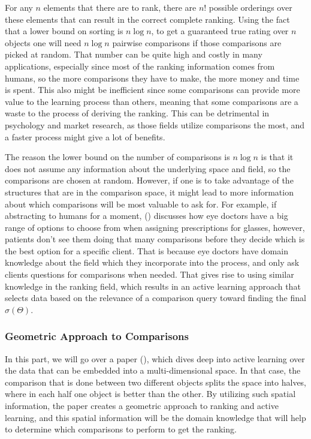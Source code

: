 \documentclass[
  letterpaper,
  DIV=11,
  numbers=noendperiod,
  oneside]{scrreprt}
\theoremstyle{remark}
\begin{document}
For any \(n\) elements that there are to rank, there are \(n!\) possible
orderings over these elements that can result in the correct complete
ranking. Using the fact that a lower bound on sorting is \(n\log n\), to
get a guaranteed true rating over \(n\) objects one will need
\(n\log n\) pairwise comparisons if those comparisons are picked at
random. That number can be quite high and costly in many applications,
especially since most of the ranking information comes from humans, so
the more comparisons they have to make, the more money and time is
spent. This also might be inefficient since some comparisons can provide
more value to the learning process than others, meaning that some
comparisons are a waste to the process of deriving the ranking. This can
be detrimental in psychology and market research, as those fields
utilize comparisons the most, and a faster process might give a lot of
benefits.

The reason the lower bound on the number of comparisons is \(n\log n\)
is that it does not assume any information about the underlying space
and field, so the comparisons are chosen at random. However, if one is
to take advantage of the structures that are in the comparison space, it
might lead to more information about which comparisons will be most
valuable to ask for. For example, if abstracting to humans for a moment,
() discusses how eye doctors
have a big range of options to choose from when assigning prescriptions
for glasses, however, patients don't see them doing that many
comparisons before they decide which is the best option for a specific
client. That is because eye doctors have domain knowledge about the
field which they incorporate into the process, and only ask clients
questions for comparisons when needed. That gives rise to using similar
knowledge in the ranking field, which results in an active learning
approach that selects data based on the relevance of a comparison query
toward finding the final \(\sigma(\Theta)\).

\subsubsection{Geometric Approach to
Comparisons}\label{geometric-approach-to-comparisons}

In this part, we will go over a paper (), which dives deep into active learning over the data that
can be embedded into a multi-dimensional space. In that case, the
comparison that is done between two different objects splits the space
into halves, where in each half one object is better than the other. By
utilizing such spatial information, the paper creates a geometric
approach to ranking and active learning, and this spatial information
will be the domain knowledge that will help to determine which
comparisons to perform to get the ranking.
\end{document}
